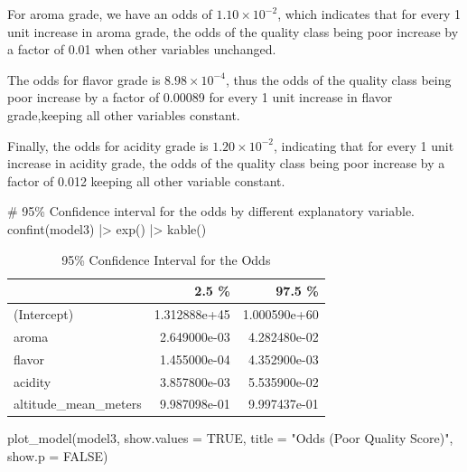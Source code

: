 \documentclass[
  letterpaper,
  DIV=11,
  numbers=noendperiod]{scrartcl}
\newenvironment{Shaded}{\begin{snugshade}}{\end{snugshade}}
\newcommand{\AttributeTok}[1]{\textcolor[rgb]{0.40,0.45,0.13}{#1}}
\newcommand{\CommentTok}[1]{\textcolor[rgb]{0.37,0.37,0.37}{#1}}
\newcommand{\ConstantTok}[1]{\textcolor[rgb]{0.56,0.35,0.01}{#1}}
\newcommand{\FunctionTok}[1]{\textcolor[rgb]{0.28,0.35,0.67}{#1}}
\newcommand{\NormalTok}[1]{\textcolor[rgb]{0.00,0.23,0.31}{#1}}
\newcommand{\SpecialCharTok}[1]{\textcolor[rgb]{0.37,0.37,0.37}{#1}}
\newcommand{\StringTok}[1]{\textcolor[rgb]{0.13,0.47,0.30}{#1}}
\begin{document}
For aroma grade, we have an odds of \(1.10\times10^{-2}\), which
indicates that for every 1 unit increase in aroma grade, the odds of the
quality class being poor increase by a factor of 0.01 when other
variables unchanged.

The odds for flavor grade is \(8.98\times10^{-4}\), thus the odds of the
quality class being poor increase by a factor of 0.00089 for every 1
unit increase in flavor grade,keeping all other variables constant.

Finally, the odds for acidity grade is \(1.20\times10^{-2}\), indicating
that for every 1 unit increase in acidity grade, the odds of the quality
class being poor increase by a factor of 0.012 keeping all other
variable constant.

\begin{Shaded}
\begin{Highlighting}[]
\CommentTok{\# 95\% Confidence interval for the odds by different explanatory variable.}
\FunctionTok{confint}\NormalTok{(model3) }\SpecialCharTok{|\textgreater{}}
  \FunctionTok{exp}\NormalTok{() }\SpecialCharTok{|\textgreater{}}
  \FunctionTok{kable}\NormalTok{()}
\end{Highlighting}
\end{Shaded}

\begin{longtable}[]{@{}lrr@{}}

\caption{\label{tbl-oddsCI}95\% Confidence Interval for the Odds}

\tabularnewline

\toprule\noalign{}
& 2.5 \% & 97.5 \% \\
\midrule\noalign{}
\endhead
\bottomrule\noalign{}
\endlastfoot
(Intercept) & 1.312888e+45 & 1.000590e+60 \\
aroma & 2.649000e-03 & 4.282480e-02 \\
flavor & 1.455000e-04 & 4.352900e-03 \\
acidity & 3.857800e-03 & 5.535900e-02 \\
altitude\_mean\_meters & 9.987098e-01 & 9.997437e-01 \\

\end{longtable}

\begin{Shaded}
\begin{Highlighting}[]
\FunctionTok{plot\_model}\NormalTok{(model3, }\AttributeTok{show.values =} \ConstantTok{TRUE}\NormalTok{, }
           \AttributeTok{title =} \StringTok{"Odds (Poor Quality Score)"}\NormalTok{, }\AttributeTok{show.p =} \ConstantTok{FALSE}\NormalTok{)}
\end{Highlighting}
\end{Shaded}
\end{document}
